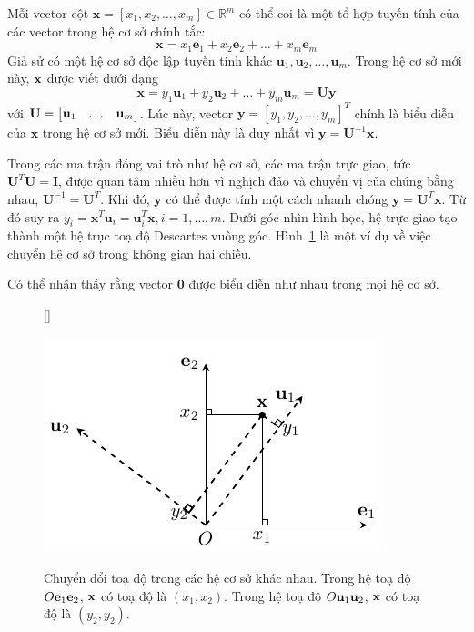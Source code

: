 Mỗi vector cột $\mathbf{x} = [x_1, x_2, \dots, x_m] \in \mathbb{R}^m$ có thể coi
là một tổ hợp tuyến tính của các vector trong hệ cơ sở chính tắc:
\begin{equation}
\mathbf{x} = x_1 \mathbf{e}_1 + x_2 \mathbf{e}_2 + \dots + x_m\mathbf{e}_m
\end{equation}
Giả sử có một hệ cơ sở độc lập tuyến tính khác $\mathbf{u}_1, \mathbf{u}_2,
\dots, \mathbf{u}_m$. Trong hệ cơ sở mới này, $\mathbf{x}$ được viết dưới dạng
\begin{equation}
\mathbf{x} = y_1 \mathbf{u}_1 + y_2 \mathbf{u}_2 + \dots + y_m\mathbf{u}_m =
\mathbf{U}\mathbf{y}
\end{equation}
với $\mathbf{U} = \left[\begin{matrix} \mathbf{u}_1 & \dots &\mathbf{u}_m\end{matrix}\right]$. Lúc này, vector $\mathbf{y} =
[y_1, y_2, \dots, y_m]^T$ chính là biểu diễn của $\mathbf{x}$ trong hệ cơ sở
mới. Biểu diễn này là duy nhất vì $\mathbf{y} =
\mathbf{U}^{-1} \mathbf{x}$.

Trong các ma trận đóng vai trò như hệ cơ sở, các ma
trận trực giao, tức $\mathbf{U}^T\mathbf{U} = \mathbf{I}$, được quan tâm nhiều
hơn vì nghịch đảo và chuyển vị của chúng bằng nhau, $\mathbf{U}^{-1} = \mathbf{U}^T$.
Khi đó, $\mathbf{y}$ có thể được tính một cách nhanh chóng $\mathbf{y} = \mathbf{U}^{T} \mathbf{x}$.
Từ đó suy ra $y_i = \mathbf{x}^T \mathbf{u}_i = \mathbf{u}_i^T\mathbf{x}, i= 1,
\dots, m$. Dưới góc nhìn hình học, hệ trực giao tạo thành một hệ trục toạ độ
Descartes vuông góc. Hình~\ref{fig:change_basis} là một ví dụ về việc chuyển hệ
cơ sở trong không gian hai chiều.

Có thể nhận thấy rằng vector $\mathbf{0}$ được biểu diễn như nhau trong mọi hệ
cơ sở.


\begin{figure}[t]
[\FBwidth]
{\caption{
Chuyển đổi toạ độ trong các hệ cơ sở khác nhau. Trong hệ toạ độ
$O\mathbf{e}_1\mathbf{e}_2$, $\mathbf{x}$ có toạ độ là $(x_1, x_2)$. Trong hệ toạ độ
$O\mathbf{u}_1\mathbf{u}_2$, $\mathbf{x}$ có toạ độ là $(y_2, y_2)$.
}
\label{fig:change_basis}}
{ %
\includegraphics[width=.5\textwidth]{Chapters/07_DimemsionalityReduction/27_pca/latex/changebasis.pdf}
}
\end{figure}



